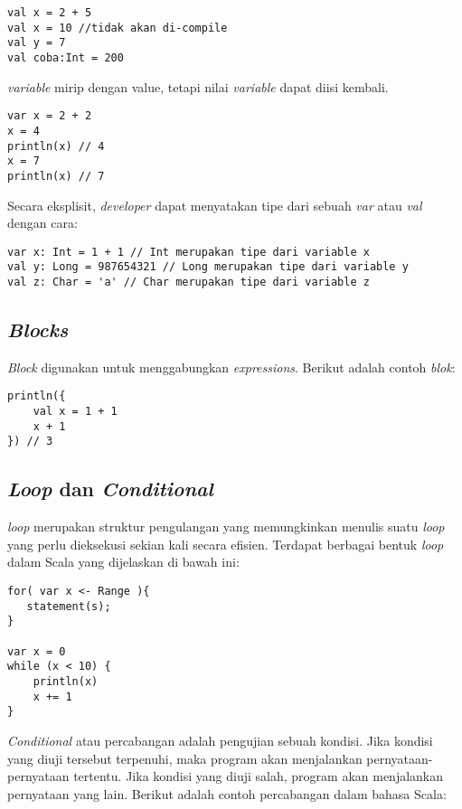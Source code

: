 \begin{verbatim}
val x = 2 + 5
val x = 10 //tidak akan di-compile 
val y = 7
val coba:Int = 200 
\end{verbatim}

\textit{variable} mirip dengan value, tetapi nilai \textit{variable} dapat diisi kembali.

\begin{verbatim}
var x = 2 + 2 
x = 4 
println(x) // 4 
x = 7 
println(x) // 7 
\end{verbatim}

Secara eksplisit, \textit{developer} dapat menyatakan tipe dari sebuah \textit{var} atau \textit{val} dengan cara:

\begin{verbatim}
var x: Int = 1 + 1 // Int merupakan tipe dari variable x
val y: Long = 987654321 // Long merupakan tipe dari variable y
val z: Char = 'a' // Char merupakan tipe dari variable z
\end{verbatim}

\subsection{\textit{Blocks}}

\textit{Block} digunakan untuk menggabungkan \textit{expressions}. Berikut adalah contoh \textit{blok}:

\begin{verbatim}
println({
    val x = 1 + 1
    x + 1
}) // 3 
\end{verbatim}

\subsection{\textit{Loop} dan \textit{Conditional}}

\textit{loop} merupakan struktur pengulangan yang memungkinkan menulis suatu \textit{loop} yang perlu dieksekusi sekian kali secara efisien. Terdapat berbagai bentuk \textit{loop} dalam Scala yang dijelaskan di bawah ini: 

\begin{verbatim}
for( var x <- Range ){
   statement(s);
}

var x = 0
while (x < 10) {
    println(x)
    x += 1
}
\end{verbatim}

\textit{Conditional} atau percabangan adalah pengujian sebuah kondisi. Jika kondisi yang diuji tersebut terpenuhi, maka program akan menjalankan pernyataan-pernyataan tertentu. Jika kondisi yang diuji salah, program akan menjalankan pernyataan yang lain. Berikut adalah contoh percabangan dalam bahasa Scala:

